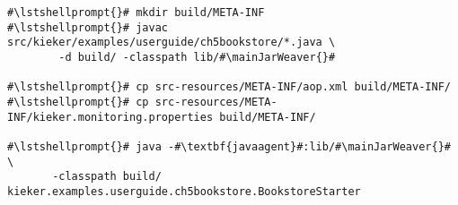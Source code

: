 \begin{lstlisting}[caption=Commands to compile and run the Bookstore under \UnixLikeSystems, label=lst:traceAnalysisCompileRunExample1]
#\lstshellprompt{}# mkdir build/META-INF
#\lstshellprompt{}# javac src/kieker/examples/userguide/ch5bookstore/*.java \
        -d build/ -classpath lib/#\mainJarWeaver{}#

#\lstshellprompt{}# cp src-resources/META-INF/aop.xml build/META-INF/
#\lstshellprompt{}# cp src-resources/META-INF/kieker.monitoring.properties build/META-INF/

#\lstshellprompt{}# java -#\textbf{javaagent}#:lib/#\mainJarWeaver{}# \
       -classpath build/ kieker.examples.userguide.ch5bookstore.BookstoreStarter
\end{lstlisting}
